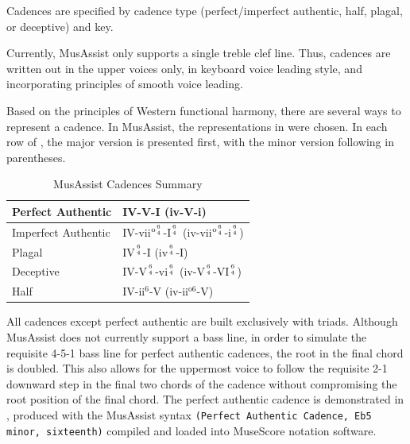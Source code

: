 \documentclass{article}
\begin{document}
Cadences are specified by cadence type (perfect/imperfect authentic, half, plagal, or deceptive) and key.

Currently, MusAssist only supports a single treble clef line. Thus, cadences are written out in the upper voices only, in keyboard voice leading style, and incorporating principles of smooth voice leading.

Based on the principles of Western functional harmony, there are several ways to represent a cadence. In MusAssist, the representations in  were chosen. In each row of , the major version is presented first, with the minor version following in parentheses.

\begin{table}[h!]
\centering
      \renewcommand{\arraystretch}{1.5}
\begin{tabular}{|l|l|}
\hline
Perfect Authentic & IV-V-I (iv-V-i) \\ \hline
Imperfect Authentic & IV-vii$^{\text{o}{6 \atop 4}}$-I$^{6 \atop 4}$ (iv-vii$^{\text{o}{6 \atop 4}}$-i$^{6 \atop 4}$) \\ \hline
Plagal & IV$^{6 \atop 4}$-I (iv$^{6 \atop 4}$-I) \\ \hline
Deceptive & IV-V$^{6 \atop 4}$-vi$^{6 \atop 4}$ (iv-V$^{6 \atop 4}$-VI$^{6 \atop 4}$) \\ \hline
Half & IV-ii$^6$-V (iv-ii$^{\text{o}6}$-V) \\ \hline
\end{tabular}
\caption{MusAssist Cadences Summary}\label{table:cadences}
\vspace{-3mm}
\end{table}

All cadences except perfect authentic are built exclusively with triads. Although MusAssist does not currently support a bass line, in order to simulate the requisite 4-5-1 bass line for perfect authentic cadences, the root in the final chord is doubled. This also allows for the uppermost voice to follow the requisite 2-1 downward step in the final two chords of the cadence without compromising the root position of the final chord. The perfect authentic cadence is demonstrated in , produced with the MusAssist syntax
 \verb!(Perfect Authentic Cadence, Eb5! \\ \verb!minor, sixteenth)! compiled and loaded into MuseScore notation software.
\end{document}
